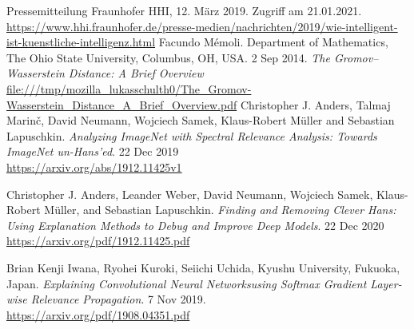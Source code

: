\documentclass{article}
\theoremstyle{break}
\begin{document}
\begin{thebibliography}{9}
	Pressemitteilung Fraunhofer HHI, 12. März 2019. Zugriff am 21.01.2021.
	\url{https://www.hhi.fraunhofer.de/presse-medien/nachrichten/2019/wie-intelligent-ist-kuenstliche-intelligenz.html}
	Facundo Mémoli. Department of Mathematics, The Ohio State University, Columbus, OH, USA. 2 Sep 2014.
	\textsl{The Gromov–Wasserstein Distance: A Brief Overview}
	\url{file:///tmp/mozilla_lukasschulth0/The_Gromov-Wasserstein_Distance_A_Brief_Overview.pdf}
	Christopher J. Anders, Talmaj Marinč, David Neumann, Wojciech Samek, Klaus-Robert Müller and Sebastian Lapuschkin.
	\textsl{Analyzing ImageNet with Spectral Relevance Analysis: Towards ImageNet un-Hans’ed}. 22 Dec 2019 \\
	\url{https://arxiv.org/abs/1912.11425v1}
	
	Christopher J. Anders, Leander Weber, David Neumann, Wojciech Samek, Klaus-Robert Müller, and Sebastian Lapuschkin.
	\textsl{Finding and Removing Clever Hans: Using Explanation Methods to Debug and Improve Deep Models}. 22 Dec 2020 \\
	\url{https://arxiv.org/pdf/1912.11425.pdf}
	
	Brian Kenji Iwana, Ryohei Kuroki, Seiichi Uchida,
	Kyushu University, Fukuoka, Japan. 
	\textsl{Explaining Convolutional Neural Networksusing Softmax Gradient Layer-wise Relevance Propagation}. 7 Nov 2019.\\
	\url{https://arxiv.org/pdf/1908.04351.pdf}
	 
	
	
	
	
	
\end{thebibliography}
\end{document}
